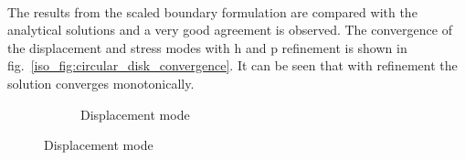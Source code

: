 \paragraph{}
The results from the scaled boundary formulation are compared with the analytical solutions and a very good agreement is observed.
The convergence of the displacement and stress modes with h and p refinement is shown in fig.~\ref{iso_fig:circular_disk_convergence}.
It can be seen that with refinement the solution converges monotonically.
    \begin{figure}[h!]
        \begin{subfigure}[b]{1\linewidth}
            \centering
            \caption{Displacement mode}
        \end{subfigure}


\end{figure}

